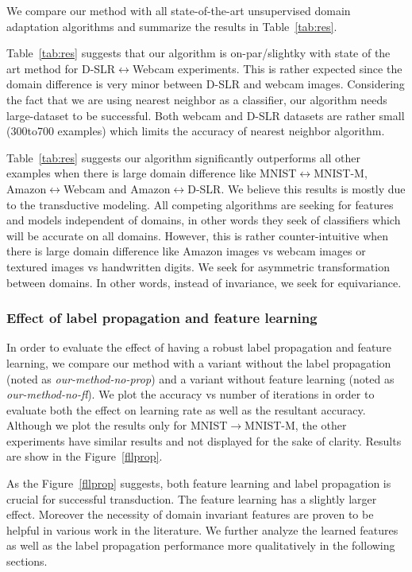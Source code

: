 We compare our method with all state-of-the-art unsupervised domain adaptation algorithms and summarize the results in Table~\ref{tab:res}. 

Table~\ref{tab:res} suggests that our algorithm is on-par/slightky with state of the art method for D-SLR$\leftrightarrow$Webcam experiments. This is rather expected since the domain difference is very minor between D-SLR and webcam images. Considering the fact that we are using nearest neighbor as a classifier, our algorithm needs large-dataset to be successful. Both webcam and D-SLR datasets are rather small (300to700 examples) which limits the accuracy of nearest neighbor algorithm.

Table~\ref{tab:res} suggests our algorithm significantly outperforms all other examples when there is large domain difference like MNIST$\leftrightarrow$MNIST-M, Amazon$\leftrightarrow$Webcam and Amazon$\leftrightarrow$D-SLR. We believe this results is mostly due to the transductive modeling. All competing algorithms are seeking for features and models independent of domains, in other words they seek of classifiers which will be accurate on all domains. However, this is rather counter-intuitive when there is large domain difference like Amazon images vs webcam images or textured images vs handwritten digits. We seek for asymmetric transformation between domains. In other words, instead of invariance, we seek for equivariance. 


\subsubsection{Effect of label propagation and feature learning}
In order to evaluate the effect of having a robust label propagation and feature learning, we compare our method with a variant without the label propagation (noted as \emph{our-method-no-prop}) and a variant without feature learning (noted as \emph{our-method-no-fl}). We plot the accuracy vs number of iterations in order to evaluate both the effect on learning rate as well as the resultant accuracy. Although we plot the results only for MNIST$\rightarrow$MNIST-M, the other experiments have similar results and not displayed for the sake of clarity. Results are show in the Figure~\ref{fllprop}. 

As the Figure~\ref{fllprop} suggests, both feature learning and label propagation is crucial for successful transduction. The feature learning has a slightly larger effect. Moreover the necessity of domain invariant features are proven to be helpful in various work\cite{ganin15, tzeng14} in the literature. We further analyze the learned features as well as the label propagation performance more qualitatively in the following sections.

